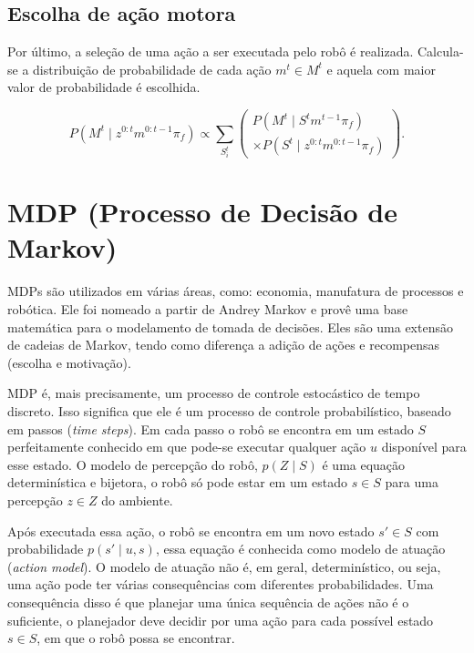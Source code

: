 \subsection{Escolha de ação motora}

Por último, a seleção de uma ação a ser executada pelo robô é realizada. Calcula-se a distribuição de probabilidade de cada ação $ m^t \in M^t $ e aquela com maior valor de probabilidade é escolhida.

\begin{equation}
    P \left( M^t \mid z^{0: t} m^{0: t-1} \pi_f \right) \propto \sum\limits_{S_i^t}
        \left(
            \begin{array}{l}
                P \left( M^t \mid S^t m^{t-1} \pi_f \right)\\
                \times P \left( S^t \mid z^{0: t} m^{0: t-1} \pi_f \right)
            \end{array}
        \right).
\end{equation}


\section{MDP (Processo de Decisão de Markov)} \label{section:MDP}

MDPs são utilizados em várias áreas, como: economia, manufatura de processos e robótica. Ele foi nomeado a partir de Andrey Markov e provê uma base matemática para o modelamento de tomada de decisões. Eles são uma extensão de cadeias de Markov, tendo como diferença a adição de ações e recompensas (escolha e motivação).

MDP é, mais precisamente, um processo de controle estocástico de tempo discreto. Isso significa que ele é um processo de controle probabilístico, baseado em passos (\textit{time steps}). Em cada passo o robô se encontra em um estado $ S $ perfeitamente conhecido em que pode-se executar qualquer ação $ u $ disponível para esse estado. O modelo de percepção do robô, $ p \left( Z \mid S \right) $ é uma equação determinística e bijetora, o robô só pode estar em um estado $ s \in S $ para uma percepção $ z \in Z $ do ambiente.

Após executada essa ação, o robô se encontra em um novo estado $ s' \in S $ com probabilidade $ p \left( s' \mid u, s \right) $, essa equação é conhecida como modelo de atuação (\textit{action model}). O modelo de atuação não é, em geral, determinístico, ou seja, uma ação pode ter várias consequências com diferentes probabilidades. Uma consequência disso é que planejar uma única sequência de ações não é o suficiente, o planejador deve decidir por uma ação para cada possível estado $ s \in S $, em que o robô possa se encontrar.

